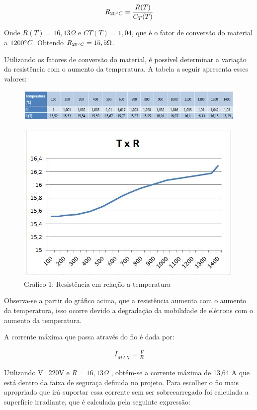 \begin{align}
R_{20\degree C} = \frac{R(T)}{C_T(T)}
\end{align}

Onde $R(T)=16,13\Omega$ e $CT(T)=1,04$, que é o fator de conversão do material a $1200\degree C$. Obtendo $R_{20\degree C}=15,5\Omega$.

Utilizando os fatores de conversão do material, é possível determinar a variação da resistência com o aumento da temperatura. A tabela a seguir apresenta esses valores:

\begin{figure}[H]
	\centering
	\label{tabela1}
	\includegraphics[keepaspectratio=true,scale=0.9]{figuras/alimentacao0.JPG}
\end{figure}
\begin{figure}[!h]
	\centering
	\label{grafico1}
	\includegraphics[keepaspectratio=true,scale=0.8]{figuras/alimentacao0_1.JPG}
	\caption{Gráfico 1:  Resistência em relação a temperatura}
\end{figure}

Observa-se a partir do gráfico acima, que a resistência aumenta com o aumento da temperatura, isso ocorre devido a degradação da  mobilidade de elétrons com o aumento da temperatura.

A corrente máxima que passa através do fio é dada por:

\begin{align}
I_{M\acute{A}X} = \frac{V}{R}
\end{align}

Utilizando V=220V e $R=16,13\Omega$ , obtém-se a corrente máxima de 13,64 A que está dentro da faixa de seguraça definida no projeto. Para escolher o fio mais apropriado que irá suportar essa corrente sem ser sobrecarregado foi calculada a superfície irradiante, que é calculada pela seguinte expressão:

